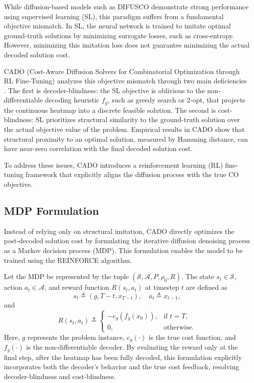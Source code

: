 While diffusion-based models such as DIFUSCO demonstrate strong performance using supervised
learning (SL), this paradigm suffers from a fundamental objective mismatch. In SL, the neural
network is trained to imitate optimal ground-truth solutions by minimizing surrogate losses,
such as cross-entropy. However, minimizing this imitation loss does not guarantee minimizing
the actual decoded solution cost.

CADO (Cost-Aware Diffusion Solvers for Combinatorial Optimization through RL Fine-Tuning)
analyzes this objective mismatch through two main deficiencies \citep{yoon2024cado}. The
first is decoder-blindness: the SL objective is oblivious to the non-differentiable decoding
heuristic $f_g$, such as greedy search or 2-opt, that projects the continuous heatmap into a
discrete feasible solution. The second is cost-blindness: SL prioritizes structural similarity
to the ground-truth solution over the actual objective value of the problem. Empirical results
in CADO show that structural proximity to an optimal solution, measured by Hamming distance,
can have near-zero correlation with the final decoded solution cost.

To address these issues, CADO introduces a reinforcement learning (RL) fine-tuning framework
that explicitly aligns the diffusion process with the true CO objective.

\subsection{MDP Formulation}
\label{subsec:cado-mdp}

Instead of relying only on structural imitation, CADO directly optimizes the post-decoded
solution cost by formulating the iterative diffusion denoising process as a Markov decision
process (MDP). This formulation enables the model to be trained using the REINFORCE
algorithm.

Let the MDP be represented by the tuple $(\mathcal{S}, \mathcal{A}, P, \rho_0, R)$. The
state $s_t\in\mathcal{S}$, action $a_t\in\mathcal{A}$, and reward function $R(s_t,a_t)$ at
timestep $t$ are defined as
\[
s_t \triangleq (g, T-t, x_{T-t}), \quad a_t \triangleq x_{t-1},
\]
and
\[
R(s_t, a_t) \triangleq
\begin{cases}
-c_g(f_g(x_0)), & \text{if } t = T, \\
0, & \text{otherwise.}
\end{cases}
\]
Here, $g$ represents the problem instance, $c_g(\cdot)$ is the true cost function, and
$f_g(\cdot)$ is the non-differentiable decoder. By evaluating the reward only at the final
step, after the heatmap has been fully decoded, this formulation explicitly incorporates both
the decoder's behavior and the true cost feedback, resolving decoder-blindness and
cost-blindness.

